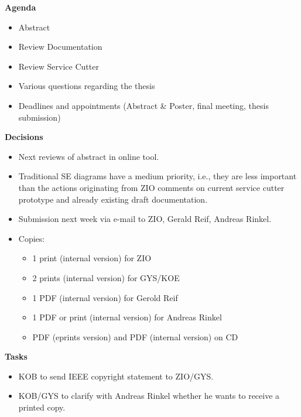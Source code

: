 \textbf{Agenda}

\begin{itemize}
\item Abstract
\item Review Documentation 
\item Review Service Cutter
\item Various questions regarding the thesis
\item Deadlines and appointments (Abstract \& Poster, final meeting, thesis submission)
\end{itemize}

\textbf{Decisions}

\begin{itemize}
\item Next reviews of abstract in online tool.
\item Traditional SE diagrams have a medium priority, i.e., they are less important than the actions originating from ZIO comments on current service cutter prototype and already existing draft documentation.
\item Submission next week via e-mail to ZIO, Gerald Reif, Andreas Rinkel.
\item Copies:
	\begin{itemize}
	\item 1 print (internal version) for ZIO
	\item 2 prints (internal version) for GYS/KOE
	\item 1 PDF (internal version) for Gerold Reif
	\item 1 PDF or print (internal version) for Andreas Rinkel
	\item PDF (eprints version) and PDF (internal version) on CD
	\end{itemize}
\end{itemize}

\textbf{Tasks}

\begin{itemize}
\item KOB to send IEEE copyright statement to ZIO/GYS.
\item KOB/GYS to clarify with Andreas Rinkel whether he wants to receive a printed copy.
\end{itemize}
